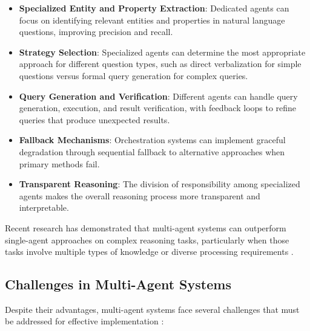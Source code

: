 \begin{itemize}
    \item \textbf{Specialized Entity and Property Extraction}: Dedicated agents can focus on identifying relevant entities and properties in natural language questions, improving precision and recall.
    
    \item \textbf{Strategy Selection}: Specialized agents can determine the most appropriate approach for different question types, such as direct verbalization for simple questions versus formal query generation for complex queries.
    
    \item \textbf{Query Generation and Verification}: Different agents can handle query generation, execution, and result verification, with feedback loops to refine queries that produce unexpected results.
    
    \item \textbf{Fallback Mechanisms}: Orchestration systems can implement graceful degradation through sequential fallback to alternative approaches when primary methods fail.
    
    \item \textbf{Transparent Reasoning}: The division of responsibility among specialized agents makes the overall reasoning process more transparent and interpretable.
\end{itemize}

Recent research has demonstrated that multi-agent systems can outperform single-agent approaches on complex reasoning tasks, particularly when those tasks involve multiple types of knowledge or diverse processing requirements \citep{langchain2025langgraph}.

\subsection{Challenges in Multi-Agent Systems}
\label{sec:agent-challenges}
Despite their advantages, multi-agent systems face several challenges that must be addressed for effective implementation \citep{aws2025multiagent}:

